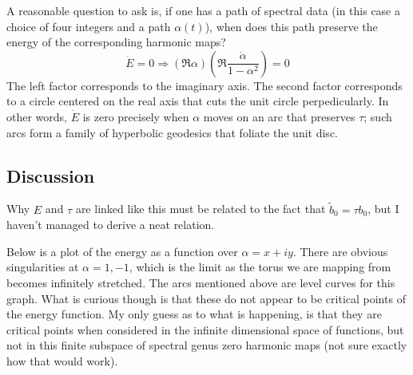 \documentclass{article}
\begin{document}
A reasonable question to ask is, if one has a path of spectral data (in this case a choice of four integers and a path $\alpha(t)$), when does this path preserve the energy of the corresponding harmonic maps?
\[
\dot E = 0 \Rightarrow \left(\Re \alpha\right)\left( \Re \frac{\dot \alpha}{1-\alpha^2} \right) = 0
\]
The left factor corresponds to the imaginary axis. The second factor corresponds to a circle centered on the real axis that cuts the unit circle perpedicularly. In other words, $\dot E$ is zero precisely when $\alpha$ moves on an arc that preserves $\tau$; such arcs form a family of hyperbolic geodesics that foliate the unit disc.

\subsection*{Discussion}
Why $E$ and $\tau$ are linked like this must be related to the fact that $\tilde b_0 = \tau b_0$, but I haven't managed to derive a neat relation.

Below is a plot of the energy as a function over $\alpha = x + i y$. There are obvious singularities at $\alpha=1,-1$, which is the limit as the torus we are mapping from becomes infinitely stretched. The arcs mentioned above are level curves for this graph. What is curious though is that these do not appear to be critical points of the energy function. My only guess as to what is happening, is that they are critical points when considered in the infinite dimensional space of functions, but not in this finite subspace of spectral genus zero harmonic maps (not sure exactly how that would work).

\begin{center}
\end{center}
\end{document}
